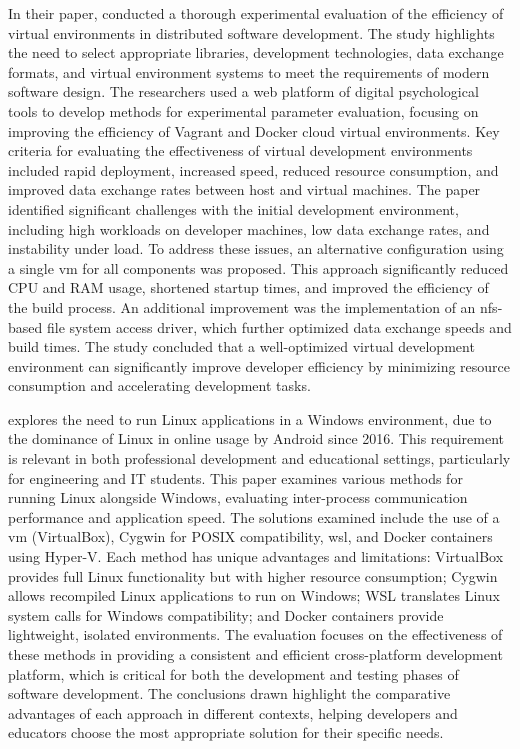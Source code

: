 In their paper, \citet{kolyasnikovExperimentalEvaluationVirtual2019} conducted a thorough experimental evaluation of the efficiency of virtual environments in distributed software development.
The study highlights the need to select appropriate libraries, development technologies, data exchange formats, and virtual environment systems to meet the requirements of modern software design.
The researchers used a web platform of digital psychological tools to develop methods for experimental parameter evaluation, focusing on improving the efficiency of Vagrant and Docker cloud virtual environments.
Key criteria for evaluating the effectiveness of virtual development environments included rapid deployment, increased speed, reduced resource consumption, and improved data exchange rates between host and virtual machines.
The paper identified significant challenges with the initial development environment, including high workloads on developer machines, low data exchange rates, and instability under load.
To address these issues, an alternative configuration using a single \ac{vm} for all components was proposed.
This approach significantly reduced CPU and RAM usage, shortened startup times, and improved the efficiency of the build process.
An additional improvement was the implementation of an \ac{nfs}-based file system access driver, which further optimized data exchange speeds and build times.
The study concluded that a \mbox{well-optimized} virtual development environment can significantly improve developer efficiency by minimizing resource consumption and accelerating development tasks.

\citet{ionescuAlternativesRunningLinux2019} explores the need to run Linux applications in a Windows environment, due to the dominance of Linux in online usage by Android since 2016.
This requirement is relevant in both professional development and educational settings, particularly for engineering and IT students.
This paper examines various methods for running Linux alongside Windows, evaluating inter-process communication performance and application speed.
The solutions examined include the use of a \ac{vm} (VirtualBox), Cygwin for POSIX compatibility, \ac{wsl}, and Docker containers using Hyper-V.
Each method has unique advantages and limitations: VirtualBox provides full Linux functionality but with higher resource consumption; Cygwin allows recompiled Linux applications to run on Windows; WSL translates Linux system calls for Windows compatibility; and Docker containers provide lightweight, isolated environments.
The evaluation focuses on the effectiveness of these methods in providing a consistent and efficient cross-platform development platform, which is critical for both the development and testing phases of software development.
The conclusions drawn highlight the comparative advantages of each approach in different contexts, helping developers and educators choose the most appropriate solution for their specific needs.

